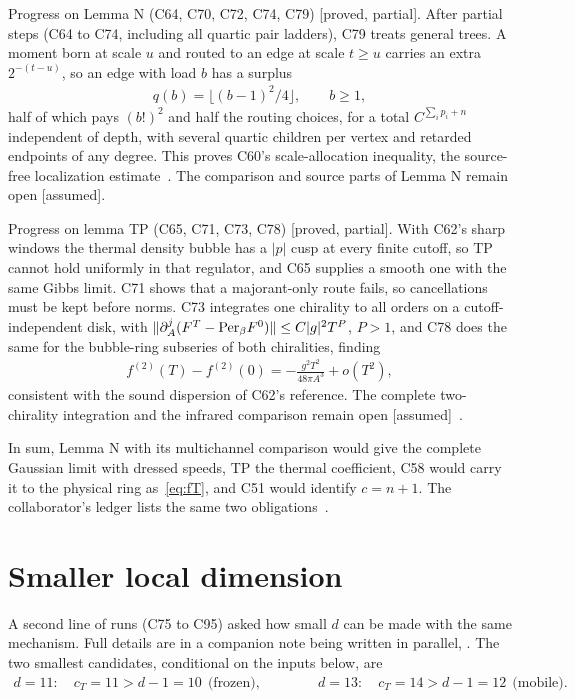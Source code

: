\documentclass[11pt]{article}
\theoremstyle{definition}
\newcommand{\st}[1]{\textup{[\textsf{#1}]}}
\begin{document}
Progress on Lemma N (C64, C70, C72, C74, C79) \st{proved, partial}. After partial steps (C64 to C74, including all quartic pair ladders), C79 treats general trees. A moment born at scale $u$ and routed to an edge at scale $t\ge u$ carries an extra $2^{-(t-u)}$, so an edge with load $b$ has a surplus
\begin{align}
q(b)=\big\lfloor (b-1)^2/4\big\rfloor ,\qquad b\ge1,
\label{eq:surplus}
\end{align}
half of which pays $(b!)^2$ and half the routing choices, for a total $C^{\sum_ip_i+n}$ independent of depth, with several quartic children per vertex and retarded endpoints of any degree. This proves C60's scale-allocation inequality, the source-free localization estimate~\cite{C64}. The comparison and source parts of Lemma N remain open \st{assumed}.

Progress on lemma TP (C65, C71, C73, C78) \st{proved, partial}. With C62's sharp windows the thermal density bubble has a $|p|$ cusp at every finite cutoff, so TP cannot hold uniformly in that regulator, and C65 supplies a smooth one with the same Gibbs limit. C71 shows that a majorant-only route fails, so cancellations must be kept before norms. C73 integrates one chirality to all orders on a cutoff-independent disk, with $\|\partial_A^j(F^T-{\rm Per}_\beta F^0)\|\le C|g|^2T^P$, $P>1$, and C78 does the same for the bubble-ring subseries of both chiralities, finding
\begin{align}
f^{(2)}(T)-f^{(2)}(0)=-\frac{g^2T^2}{48\pi A^3}+o(T^2),
\label{eq:C78}
\end{align}
consistent with the sound dispersion of C62's reference. The complete two-chirality integration and the infrared comparison remain open \st{assumed}~\cite{C64}.

In sum, Lemma N with its multichannel comparison would give the complete Gaussian limit with dressed speeds, TP the thermal coefficient, C58 would carry it to the physical ring as~\eqref{eq:fT}, and C51 would identify $c=n+1$. The collaborator's ledger lists the same two obligations~\cite{direct}.

\section{Smaller local dimension}
\label{sec:smalld}

A second line of runs (C75 to C95) asked how small $d$ can be made with the same mechanism. Full details are in a companion note being written in parallel, . The two smallest candidates, conditional on the inputs below, are
\begin{align}
d=11:\quad c_T=11>d-1=10\ \ \text{(frozen)},\qquad\qquad d=13:\quad c_T=14>d-1=12\ \ \text{(mobile)}.
\label{eq:smalld}
\end{align}
\end{document}
